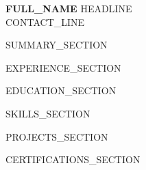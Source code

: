 \documentclass[a4paper,10pt]{article}
\begin{document}
\begin{center}
    {\Large \textbf{{{FULL_NAME}}}} \hspace{1em} \textbar \hspace{1em} \normalsize {{HEADLINE}} \\ \vspace{2pt}
    \footnotesize {{CONTACT_LINE}}
\end{center}
\vspace{-10pt}

{{SUMMARY_SECTION}}

{{EXPERIENCE_SECTION}}

{{EDUCATION_SECTION}}

{{SKILLS_SECTION}}

{{PROJECTS_SECTION}}

{{CERTIFICATIONS_SECTION}}
\end{document}
